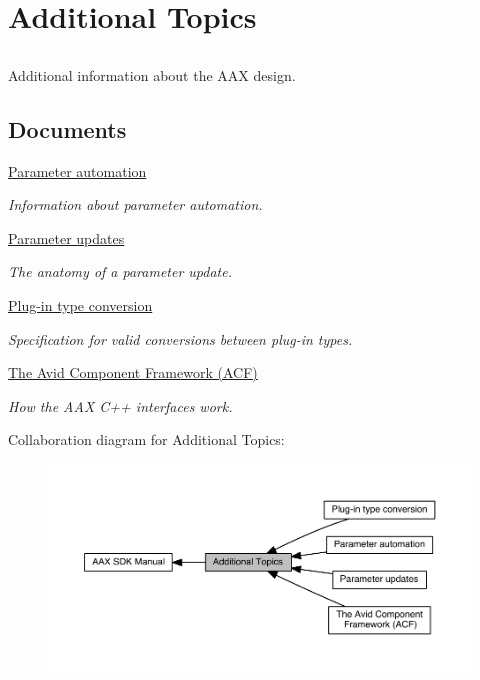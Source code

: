 \hypertarget{a00348}{}\section{Additional Topics}
\label{a00348}


\subsection{ }
Additional information about the A\+A\+X design. 

\subsection*{Documents}
\begin{DoxyCompactItemize}
\item 
\hyperlink{a00349}{Parameter automation}
\begin{DoxyCompactList}\small\item\em Information about parameter automation. \end{DoxyCompactList}\item 
\hyperlink{a00350}{Parameter updates}
\begin{DoxyCompactList}\small\item\em The anatomy of a parameter update. \end{DoxyCompactList}\item 
\hyperlink{a00356}{Plug-\/in type conversion}
\begin{DoxyCompactList}\small\item\em Specification for valid conversions between plug-\/in types. \end{DoxyCompactList}\item 
\hyperlink{a00357}{The Avid Component Framework (\+A\+C\+F)}
\begin{DoxyCompactList}\small\item\em How the A\+A\+X C++ interfaces work. \end{DoxyCompactList}\end{DoxyCompactItemize}
Collaboration diagram for Additional Topics\+:
\nopagebreak
\begin{figure}[H]
\begin{center}
\leavevmode
\includegraphics[width=350pt]{a00348}
\end{center}
\end{figure}
